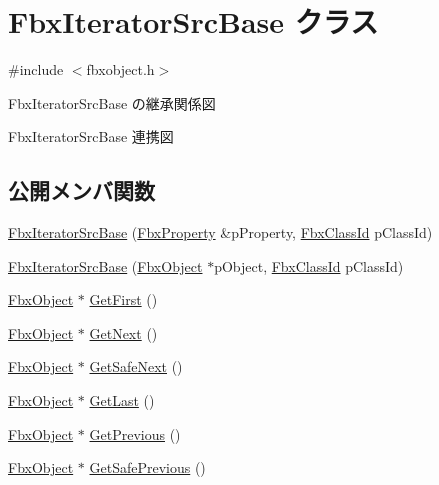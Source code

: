 \hypertarget{class_fbx_iterator_src_base}{}\section{Fbx\+Iterator\+Src\+Base クラス}
\label{class_fbx_iterator_src_base}


{\ttfamily \#include $<$fbxobject.\+h$>$}



Fbx\+Iterator\+Src\+Base の継承関係図


Fbx\+Iterator\+Src\+Base 連携図
\subsection*{公開メンバ関数}
\begin{DoxyCompactItemize}
\item 
\hyperlink{class_fbx_iterator_src_base_a98ce94a7c69a7e7bac6e01901a0a7500}{Fbx\+Iterator\+Src\+Base} (\hyperlink{class_fbx_property}{Fbx\+Property} \&p\+Property, \hyperlink{class_fbx_class_id}{Fbx\+Class\+Id} p\+Class\+Id)
\item 
\hyperlink{class_fbx_iterator_src_base_a17e8eab0754f02a28ca18b0e176f1533}{Fbx\+Iterator\+Src\+Base} (\hyperlink{class_fbx_object}{Fbx\+Object} $\ast$p\+Object, \hyperlink{class_fbx_class_id}{Fbx\+Class\+Id} p\+Class\+Id)
\item 
\hyperlink{class_fbx_object}{Fbx\+Object} $\ast$ \hyperlink{class_fbx_iterator_src_base_a19eea19f9f5fe3e94cc4a9fc626404c4}{Get\+First} ()
\item 
\hyperlink{class_fbx_object}{Fbx\+Object} $\ast$ \hyperlink{class_fbx_iterator_src_base_a640019fa81262dd57ac07bba9efc47e6}{Get\+Next} ()
\item 
\hyperlink{class_fbx_object}{Fbx\+Object} $\ast$ \hyperlink{class_fbx_iterator_src_base_ad0bb49ec584418f0325bc4f05a21ed04}{Get\+Safe\+Next} ()
\item 
\hyperlink{class_fbx_object}{Fbx\+Object} $\ast$ \hyperlink{class_fbx_iterator_src_base_a84d527f63d0b2953318bfcaac25b9b4a}{Get\+Last} ()
\item 
\hyperlink{class_fbx_object}{Fbx\+Object} $\ast$ \hyperlink{class_fbx_iterator_src_base_a953061817a99a4440f964ae584dcb0b5}{Get\+Previous} ()
\item 
\hyperlink{class_fbx_object}{Fbx\+Object} $\ast$ \hyperlink{class_fbx_iterator_src_base_a9ddd3ce318c6db15ec02ede17541f9ef}{Get\+Safe\+Previous} ()
\end{DoxyCompactItemize}
